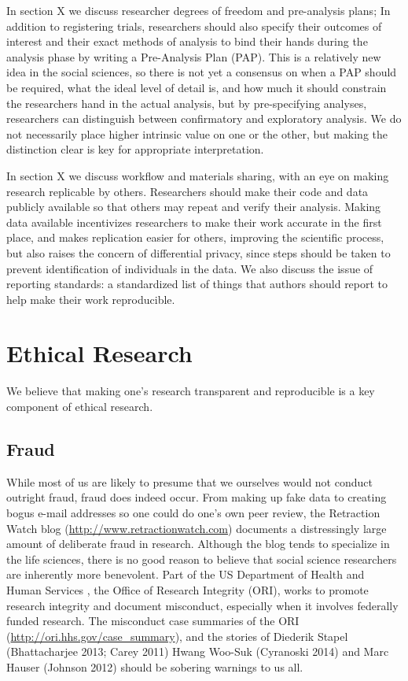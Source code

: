 \documentclass[12pt] {article}
\begin{document}
In section X we discuss researcher degrees of freedom and pre-analysis
plans; In addition to registering trials, researchers should also
specify their outcomes of interest and their exact methods of analysis
to bind their hands during the analysis phase by writing a Pre-Analysis
Plan (PAP). This is a relatively new idea in the social sciences, so
there is not yet a consensus on when a PAP should be required, what the
ideal level of detail is, and how much it should constrain the
researchers hand in the actual analysis, but by pre-specifying analyses,
researchers can distinguish between confirmatory and exploratory
analysis. We do not necessarily place higher intrinsic value on one or
the other, but making the distinction clear is key for appropriate
interpretation.

In section X we discuss workflow and materials sharing, with an eye on
making research replicable by others. Researchers should make their code
and data publicly available so that others may repeat and verify their
analysis. Making data available incentivizes researchers to make their
work accurate in the first place, and makes replication easier for
others, improving the scientific process, but also raises the concern of
differential privacy, since steps should be taken to prevent
identification of individuals in the data. We also discuss the issue of
reporting standards: a standardized list of things that authors should
report to help make their work reproducible.

\section{Ethical Research}\label{ethical-research}

We believe that making one's research transparent and reproducible is a
key component of ethical research.

\subsection{Fraud}\label{fraud}

While most of us are likely to presume that we ourselves would not
conduct outright fraud, fraud does indeed occur. From making up fake
data to creating bogus e-mail addresses so one could do one's own peer
review, the Retraction Watch blog (\url{http://www.retractionwatch.com})
documents a distressingly large amount of deliberate fraud in research.
Although the blog tends to specialize in the life sciences, there is no
good reason to believe that social science researchers are inherently
more benevolent. Part of the US Department of Health and Human Services
, the Office of Research Integrity (ORI), works to promote research
integrity and document misconduct, especially when it involves federally
funded research. The misconduct case summaries of the ORI
(\url{http://ori.hhs.gov/case_summary}), and the stories of Diederik
Stapel (Bhattacharjee 2013; Carey 2011) Hwang Woo-Suk (Cyranoski 2014)
and Marc Hauser (Johnson 2012) should be sobering warnings to us all.
\end{document}
